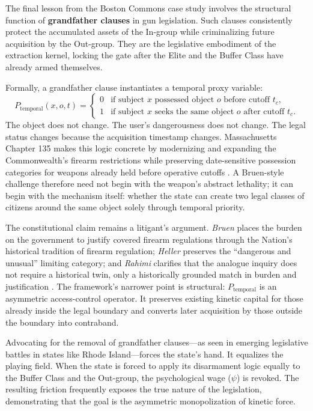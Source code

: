The final lesson from the Boston Commons case study involves the structural function of \textbf{grandfather clauses} in gun legislation. Such clauses consistently protect the accumulated assets of the In-group while criminalizing future acquisition by the Out-group. They are the legislative embodiment of the extraction kernel, locking the gate after the Elite and the Buffer Class have already armed themselves.

Formally, a grandfather clause instantiates a temporal proxy variable:
\begin{equation}\label{eq:15.1-temporal-firearm-proxy}
P_{\text{temporal}}(x,o,t) =
\begin{cases}
0 & \text{if subject } x \text{ possessed object } o \text{ before cutoff } t_c,\\
1 & \text{if subject } x \text{ seeks the same object } o \text{ after cutoff } t_c.
\end{cases}
\end{equation}
The object does not change. The user's dangerousness does not change. The legal status changes because the acquisition timestamp changes. Massachusetts Chapter 135 makes this logic concrete by modernizing and expanding the Commonwealth's firearm restrictions while preserving date-sensitive possession categories for weapons already held before operative cutoffs \cite{mass_chapter_135_2024}. A Bruen-style challenge therefore need not begin with the weapon's abstract lethality; it can begin with the mechanism itself: whether the state can create two legal classes of citizens around the same object solely through temporal priority.

The constitutional claim remains a litigant's argument. \textit{Bruen} places the burden on the government to justify covered firearm regulations through the Nation's historical tradition of firearm regulation; \textit{Heller} preserves the ``dangerous and unusual'' limiting category; and \textit{Rahimi} clarifies that the analogue inquiry does not require a historical twin, only a historically grounded match in burden and justification \cite{bruen, heller, rahimi2024}. The framework's narrower point is structural: $P_{\text{temporal}}$ is an asymmetric access-control operator. It preserves existing kinetic capital for those already inside the legal boundary and converts later acquisition by those outside the boundary into contraband.

Advocating for the removal of grandfather clauses---as seen in emerging legislative battles in states like Rhode Island---forces the state's hand. It equalizes the playing field. When the state is forced to apply its disarmament logic equally to the Buffer Class and the Out-group, the psychological wage ($\psi$) is revoked. The resulting friction frequently exposes the true nature of the legislation, demonstrating that the goal is the asymmetric monopolization of kinetic force.

